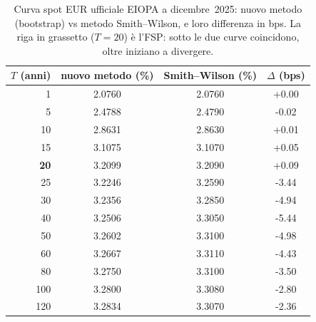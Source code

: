 \begin{table}[H]\centering\small
\caption{Curva spot EUR ufficiale EIOPA a dicembre~2025: nuovo metodo (bootstrap) vs metodo Smith--Wilson, e loro differenza in bps. La riga in grassetto ($T=20$) \`e l'FSP: sotto le due curve coincidono, oltre iniziano a divergere.}
\label{tab:sw-vs-new}\renewcommand{\arraystretch}{1.15}
\begin{tabular}{rccc}
\toprule
$T$ (anni) & nuovo metodo (\%) & Smith--Wilson (\%) & $\Delta$ (bps)\\
\midrule
\rowcolor{rowtint}1 & 2.0760 & 2.0760 & +0.00\\
5 & 2.4788 & 2.4790 & -0.02\\
\rowcolor{rowtint}10 & 2.8631 & 2.8630 & +0.01\\
15 & 3.1075 & 3.1070 & +0.05\\
\rowcolor{rowtint}\textbf{20} & 3.2099 & 3.2090 & +0.09\\
25 & 3.2246 & 3.2590 & -3.44\\
\rowcolor{rowtint}30 & 3.2356 & 3.2850 & -4.94\\
40 & 3.2506 & 3.3050 & -5.44\\
\rowcolor{rowtint}50 & 3.2602 & 3.3100 & -4.98\\
60 & 3.2667 & 3.3110 & -4.43\\
\rowcolor{rowtint}80 & 3.2750 & 3.3100 & -3.50\\
100 & 3.2800 & 3.3080 & -2.80\\
\rowcolor{rowtint}120 & 3.2834 & 3.3070 & -2.36\\
\bottomrule
\end{tabular}
\end{table}
